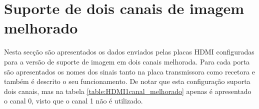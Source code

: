 %

\section{Suporte de dois canais de imagem melhorado} \label{ap1:HDMIconfigMelhorado}

Nesta secção são apresentados os dados enviados pelas placas HDMI configuradas para a versão de suporte de imagem em dois canais melhorada. Para cada porta são apresentados os nomes dos sinais tanto na placa transmissora como recetora e também é descrito o seu funcionamento. De notar que esta configuração suporta dois canais, mas na tabela \ref{table:HDMI1canal_melhorado} apenas é apresentado o canal 0, visto que o canal 1 não é utilizado.
\\


